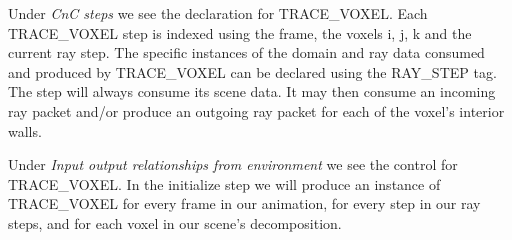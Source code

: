 Under \emph{CnC steps} we see the declaration for TRACE\_VOXEL. Each
TRACE\_VOXEL step is indexed using the frame, the voxels i, j, k and
the current ray step. The specific instances of the domain and ray
data consumed and produced by TRACE\_VOXEL can be declared using the
RAY\_STEP tag. The step will always consume its scene data. It may
then consume an incoming ray packet and/or produce an outgoing ray
packet for each of the voxel's interior walls.

Under \emph{Input output relationships from environment} we see the
control for TRACE\_VOXEL. In the initialize step we will produce an
instance of TRACE\_VOXEL for every frame in our animation, for every
step in our ray steps, and for each voxel in our scene's
decomposition.

